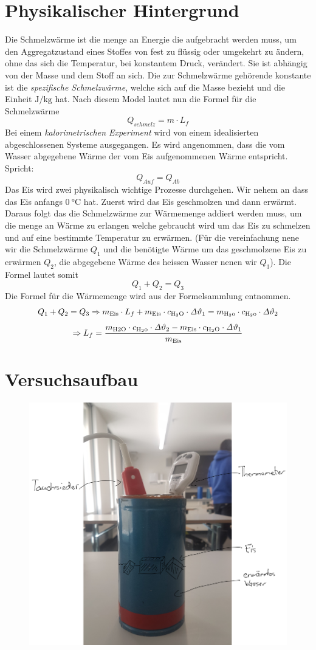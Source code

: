 \documentclass[a4 paper, 11pt]{article}
\begin{document}
\section{Physikalischer Hintergrund}
Die Schmelzwärme ist die menge an Energie die aufgebracht werden muss, um den Aggregatzustand eines Stoffes von fest zu flüssig oder umgekehrt zu ändern, ohne das sich die Temperatur, bei konstantem Druck, verändert. Sie ist abhängig von der Masse und dem Stoff an sich. Die zur Schmelzwärme gehörende konstante ist die \textit{spezifische Schmelzwärme}, welche sich auf die Masse bezieht und die Einheit $\si{\J\per\kg}$ hat. Nach diesem Model lautet nun die Formel für die Schmelzwärme 
$$ Q_{schmelz}= m \cdot L_f$$
Bei einem \textit{kalorimetrischen Experiment} wird von einem idealisierten abgeschlossenen Systeme ausgegangen. Es wird angenommen, dass die vom Wasser abgegebene Wärme der vom Eis aufgenommenen Wärme entspricht. Spricht:
$$ Q_{Auf}=Q_{Ab}$$
Das Eis wird zwei physikalisch wichtige Prozesse durchgehen. Wir nehem an dass das Eis anfangs $\SI{0}{\celsius}$ hat. Zuerst wird das Eis geschmolzen und dann erwärmt. Daraus folgt das die Schmelzwärme zur Wärmemenge addiert werden muss, um die menge an Wärme zu erlangen welche gebraucht wird um das Eis zu schmelzen und auf eine bestimmte Temperatur zu erwärmen. (Für die vereinfachung nene wir die Schmelzwärme $Q_{1}$ und die benötigte Wärme um das geschmolzene Eis zu erwärmen $Q_{2}$, die abgegebene Wärme des heissen Wasser nenen wir $Q_{3}$). Die Formel lautet somit
$$ Q_{1} + Q_{2} = Q_{3} $$
Die Formel für die Wärmemenge wird aus der Formelsammlung entnommen.
$$ Q_{1} + Q_{2} = Q_{3} \Rightarrow m_{\rm{Eis}} \cdot L_f + m_{\rm{Eis}} \cdot c_{\rm{H_2O}} \cdot \mathit{\Delta}\vartheta_1 = m_{\rm{H_2o}} \cdot c_{\rm{H_2o}} \cdot \mathit{\Delta}\vartheta_2$$ $$ \Rightarrow L_f = \frac{m_{\rm{H2O}} \cdot c_{\rm{H_2o}} \cdot \mathit{\Delta}\vartheta_2 - m_{\rm{Eis}} \cdot c_{\rm{H_2O}} \cdot \mathit{\Delta}\vartheta_1}{m_{\rm{Eis}}}$$



\section{Versuchsaufbau}
\begin{figure}[H]
    \centering
    \includegraphics[width=.5\linewidth]{image}
\end{figure}
\end{document}
